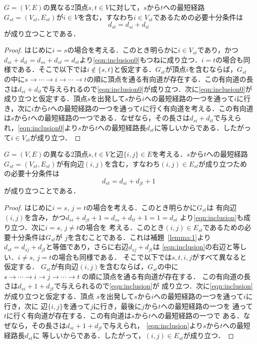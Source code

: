 \begin{lemma}
  $G=(V,E)$の異なる2頂点$s,t \in V$に対して，$s$から$t$への最短経路$G_{st}=(V_{st},E_{st})$が$i \in V$を含む，すなわち$i \in V_{st}$であるための必要十分条件は
  \begin{equation}
    d_{st}=d_{si}+d_{it}
    \label{eqn:inclusion0}
  \end{equation}
  が成り立つことである．
  \label{lemma:1}
\end{lemma}
\begin{proof}
  はじめに$i=s$の場合を考える．このとき明らかに$i \in V_{st}$であり，かつ$d_{si}+d_{it}=d_{ss}+d_{st}=d_{st}$より\eqref{eqn:inclusion0}もつねに成り立つ．$i=t$の場合も同様である．そこで以下では$i \not\in \{s,t\}$と仮定する．$G_{st}$が頂点$i$を含むならば，$G_{st}$の中に$s \rightarrow \cdots \rightarrow i \rightarrow \cdots \rightarrow t$の順に頂点を通る有向道が存在する．この有向道の長さは$d_{si}+d_{it}$で与えられるので\eqref{eqn:inclusion0}が成り立つ．次に\eqref{eqn:inclusion0}が成り立つと仮定する．頂点$s$を出発して$s$から$i$への最短経路の一つを通って$i$に行き，次に$i$から$t$への最短経路の一つを通って$t$に行く有向道を考える．この有向道は$s$から$t$への最短経路の一つである．なぜなら，その長さは$d_{si}+d_{it}$で与えられ，\eqref{eqn:inclusion0}より$s$から$t$への最短経路長$d_{st}$に等しいからである．したがって$i \in V_{st}$が成り立つ．
\end{proof}

\begin{lemma}
  $G=(V,E)$の異なる2頂点$s,t\in V$と辺$\{i,j\} \in E$を考える．$s$から$t$への最短経路$G_{st}=(V_{st},E_{st})$が有向辺$(i,j)$を含む，すなわち$(i,j) \in E_{st}$が成り立つための必要十分条件は
  \begin{equation}
    d_{st}=d_{si}+d_{jt}+1
    \label{eqn:inclusion}
  \end{equation}
  が成り立つことである．
  \label{lemma:2}
\end{lemma}
\begin{proof}
  はじめに$i=s$, $j=t$の場合を考える．このとき明らかに$G_{st}$は
  有向辺$(i,j)$を含み，かつ$d_{si}+d_{jt}+1=d_{ss}+d_{tt}+1=1=d_{st}$
  より\eqref{eqn:inclusion}も成り立つ．次に$i=s$, $j \neq t$の場合を
  考える．このとき$(i,j)\in E_{st}$であるための必要十分条件は$G_{st}$が
  $j$を含むことである．これは補題~\ref{lemma:1}より
  $d_{st}=d_{sj}+d_{jt}$と等価であり，さらに右辺$d_{sj}+d_{jt}$は
  \eqref{eqn:inclusion}の右辺と等しい．$i\neq s$, $j=t$の場合も同様である．
  そこで以下では$s,t,i,j$がすべて異なると仮定する．
  $G_{st}$が有向辺$(i,j)$を含むならば，$G_{st}$の中に
  $s \rightarrow \cdots \rightarrow i \rightarrow j \rightarrow \cdots \rightarrow t$
  の順に頂点を通る有向道が存在する．
  この有向道の長さは$d_{si}+1+d_{jt}$で与えられるので\eqref{eqn:inclusion}が
  成り立つ．次に\eqref{eqn:inclusion}が成り立つと仮定する．頂点
  $s$を出発して$s$から$i$への最短経路の一つを通って$i$に行き，次に
  辺$\{i,j\}$を通って$j$に行き，最後に$j$から$t$への最短経路の一つを
  通って$t$に行く有向道が存在する．この有向道は$s$から$t$への最短経路の一つで
  ある．なぜなら，その長さは$d_{si}+1+d_{jt}$で与えられ，
  \eqref{eqn:inclusion}より$s$から$t$への最短経路長$d_{st}$に
  等しいからである．したがって，$(i,j) \in E_{st}$が成り立つ．
\end{proof}

